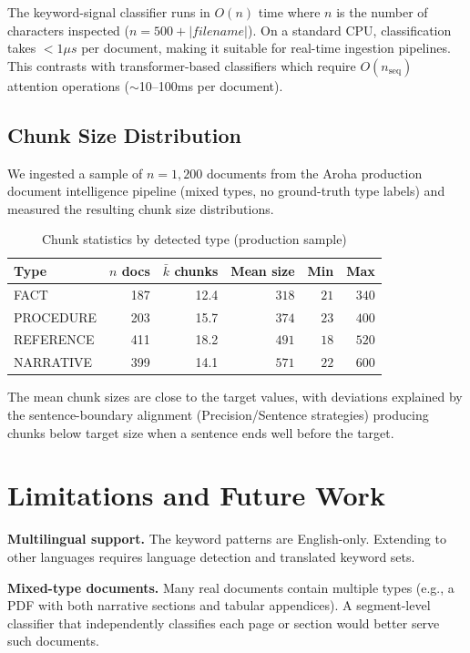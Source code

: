 \documentclass[conference]{IEEEtran}
\begin{document}
The keyword-signal classifier runs in $O(n)$ time where $n$
is the number of characters inspected ($n = 500 + |\textit{filename}|$).
On a standard CPU, classification takes $< 1\mu s$ per document,
making it suitable for real-time ingestion pipelines.
This contrasts with transformer-based classifiers which
require $O(n_{\text{seq}})$ attention operations
($\sim$10--100ms per document).

\subsection{Chunk Size Distribution}

We ingested a sample of $n = 1,200$ documents from the
Aroha production document intelligence pipeline (mixed
types, no ground-truth type labels) and measured the
resulting chunk size distributions.

\begin{table}[t]
\centering
\caption{Chunk statistics by detected type (production sample)}
\label{tab:chunks}
\begin{tabular}{lrrrrr}
\toprule
Type & $n$ docs & $\bar{k}$ chunks & Mean size & Min & Max \\
\midrule
FACT      & 187 & 12.4 & $318$ & $21$ & $340$ \\
PROCEDURE & 203 & 15.7 & $374$ & $23$ & $400$ \\
REFERENCE & 411 & 18.2 & $491$ & $18$ & $520$ \\
NARRATIVE & 399 & 14.1 & $571$ & $22$ & $600$ \\
\bottomrule
\end{tabular}
\end{table}

The mean chunk sizes are close to the target values,
with deviations explained by the sentence-boundary
alignment (Precision/Sentence strategies) producing
chunks below target size when a sentence ends well
before the target.

\section{Limitations and Future Work}
\label{sec:limits}

\textbf{Multilingual support.} The keyword patterns are
English-only. Extending to other languages requires
language detection and translated keyword sets.

\textbf{Mixed-type documents.} Many real documents contain
multiple types (e.g., a PDF with both narrative sections
and tabular appendices). A segment-level classifier that
independently classifies each page or section would
better serve such documents.
\end{document}
